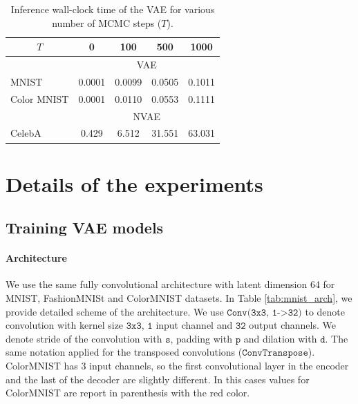 \begin{table}[ht]
\begin{center}
\begin{small}
\begin{sc}
\caption{Inference wall-clock time of the VAE for various number of MCMC steps ($T$).}
\label{tab:inferece_time}
\begin{tabular}{l|cccc}
\toprule
\multicolumn{1}{c|}{$T$} &  0 & 100 & 500 &  1000 \\
\midrule
 & \multicolumn{4}{c}{VAE} \\
MNIST & 0.0001 & 0.0099 & 0.0505 & 0.1011\\
Color MNIST & 0.0001& 0.0110 & 0.0553 & 0.1111\\
\midrule
& \multicolumn{4}{c}{NVAE}  \\
CelebA & 0.429 & 6.512 & 31.551 & 63.031\\
\bottomrule
\end{tabular}  
\end{sc}
\end{small}
\end{center}
\end{table}

\newpage

\section{Details of the experiments} \label{appendix:experimental_details}
\subsection{Training VAE models} \label{appendix:beta_vae_param}

\paragraph{Architecture} We use the same fully convolutional architecture with latent dimension 64 for MNIST, FashionMNISt and ColorMNIST datasets. In Table \ref{tab:mnist_arch}, we provide detailed scheme of the architecture. We use $\texttt{Conv(3x3, 1->32)}$ to denote convolution with kernel size $\texttt{3x3}$, $\texttt{1}$ input channel and  $\texttt{32}$ output channels. We denote stride of the convolution with $\texttt{s}$, padding with $\texttt{p}$ and dilation with $\texttt{d}$. The same notation applied for the transposed convolutions ($\texttt{ConvTranspose}$). ColorMNIST has 3 input channels, so the first convolutional layer in the encoder and the last of the decoder are slightly different. In this cases  values for ColorMNIST are report in parenthesis with the red color. 

